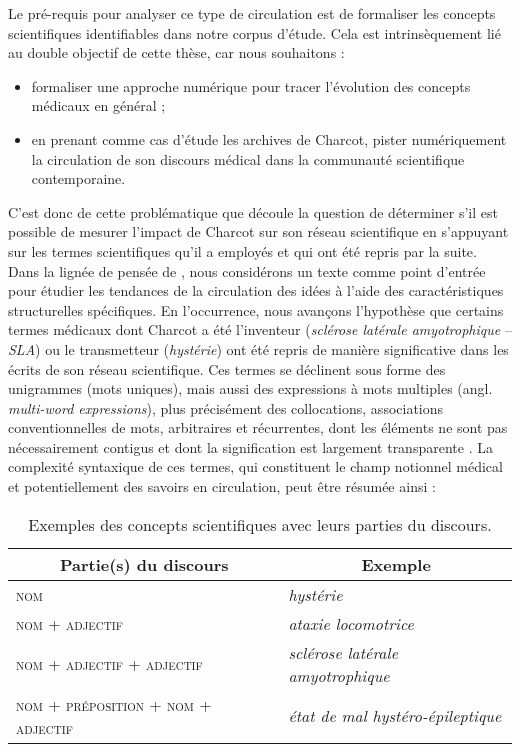 Le pré-requis pour analyser ce type de circulation est de formaliser les concepts scientifiques identifiables dans notre corpus d'étude.
Cela est intrinsèquement lié au double objectif de cette thèse, car nous souhaitons :
\begin{itemize} 
	\item formaliser une approche numérique pour tracer l'évolution des concepts médicaux en général ;
	\item en prenant comme cas d'étude les archives de Charcot, pister numériquement la circulation de son discours médical dans la communauté scientifique contemporaine.
\end{itemize}
\medskip

C'est donc de cette problématique que découle la question de déterminer s'il est possible de mesurer l'impact de Charcot sur son réseau scientifique en s'appuyant sur les termes scientifiques qu'il a employés et qui ont été repris par la suite. Dans la lignée de pensée de \citet{milia2023}, nous considérons un texte comme point d'entrée pour étudier les tendances de la circulation des idées à l'aide des caractéristiques structurelles spécifiques. En l'occurrence, nous avançons l'hypothèse que certains termes médicaux dont Charcot a été l'inventeur (\textit{sclérose latérale amyotrophique} -- \textit{SLA}) ou le transmetteur (\textit{hystérie}) ont été repris de manière significative dans les écrits de son réseau scientifique. Ces termes se déclinent sous forme des unigrammes (mots uniques), mais aussi des expressions à mots multiples (angl. \textit{multi-word expressions}), plus précisément des collocations, \og{}associations conventionnelles de mots, arbitraires et récurrentes, dont les éléments ne sont pas nécessairement contigus et dont la signification est largement transparente\fg{} \citep[p. 96]{nerima2006}. La complexité syntaxique de ces termes, qui constituent le champ notionnel médical et potentiellement des savoirs en circulation, peut être résumée ainsi :
\begin{table}[h]
	\centering
	\begin{tabular}{l|l}
		\multicolumn{1}{c|}{Partie(s) du discours} & \multicolumn{1}{c}{Exemple} \\
		\hline
		\textsc{nom} & \textit{hystérie}\\
		\textsc{nom + adjectif} & \textit{ataxie locomotrice}\\
		\textsc{nom + adjectif + adjectif} & \textit{sclérose latérale amyotrophique}\\
		\textsc{nom + préposition + nom + adjectif} & \textit{état de mal hystéro-épileptique}
	\end{tabular}
	\caption{Exemples des concepts scientifiques avec leurs parties du discours.}
\end{table}




